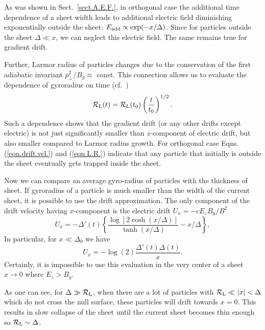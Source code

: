 \documentclass[useAMS,usenatbib]{mn2e}
\begin{document}
As was shown in Sect.~\ref{sect.A.E.F.}, in orthogonal case the additional time 
dependence of a sheet width leads to additional electric field diminishing 
exponentially outside the sheet: $E_{\rm add}\propto\exp(-x/\Delta)$. Since for 
particles outside the sheet $\Delta\ll x$, we can neglect this electric field. 
The same remains true for gradient drift.
 
Further, Larmor radius of particles changes due to the conservation of the first 
adiabatic invariant $p_{\perp}^2/B_y \approx$ const. This connection allows 
us to evaluate the dependence of gyroradius on time (cf.~\citealt{2001ApJ...547..437L})
\begin{equation}
\label{eqn.L.R.}
\mathcal{R}_{\rm L}(t) = \mathcal{R}_{\rm L}(t_0)\left(\dfrac{t}{t_0}\right)^{1/2}.
\end{equation}
Such a dependence shows that the gradient drift (or any other drifts except electric) 
is not just significantly smaller than $z$-component of electric drift, but 
also smaller compared to Larmor radius growth. For orthogonal case 
Eqns. (\ref{eqn.drift.vel.}) and (\ref{eqn.L.R.}) indicate that any particle that 
initially is outside the sheet eventually gets trapped inside the sheet.

Now we can compare an average gyro-radius of particles with the thickness of sheet. 
If gyroradius of a particle is much smaller than the width 
of the current sheet, it is possible to use the drift approximation. The only component 
of the drift velocity having $x$-component is the electric drift 
\mbox{$U_{x} = -c E_{z}B_{y}/B^2$} 
\begin{equation}
U_{x} = -\Delta'(t)
\left\{\dfrac{\log\left[2\cosh( x/\Delta)\right]}{\tanh (x/\Delta)}  - x/\Delta\right\},
\label{eq:Ux}
\end{equation}
 In particular, for \mbox{$x \ll \Delta_0$} we have
\begin{equation}
U_{x} = -\log(2)\frac{\Delta'(t)\Delta(t)}{x}.
\end{equation}
Certainly, it is impossible to use this evaluation in the very center of a sheet $x \rightarrow 0$
where $E_{z} > B_{y}$.

As one can see, for $\Delta \gg {\cal R}_{\rm L}$, when there are a lot of particles 
with $\mathcal{R}_{\rm L} \ll |x| < \Delta$ which do not cross the null surface, these 
particles will drift towards $x = 0$. This results in slow collapse of the sheet until 
the current sheet becomes thin enough so $\mathcal{R}_{\rm L} \sim \Delta$.
\end{document}
